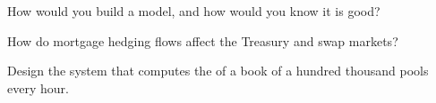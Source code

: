 \begin{interviewq}\label{iq:m2:mortgages-and-agencies:4}
How would you build a  model, and how would you know it is good?
\end{interviewq}

\begin{interviewq}\label{iq:m2:mortgages-and-agencies:5}
How do mortgage hedging flows affect the Treasury and swap markets?
\end{interviewq}

\begin{interviewq}\label{iq:m2:mortgages-and-agencies:6}
Design the system that computes the  of a book of a hundred
thousand pools every hour.
\end{interviewq}
